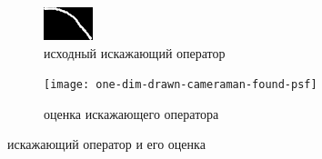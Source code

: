 \begin{figure}[h!]
	\centering
	\begin{subfigure}[b]{0.4\textwidth}
		\centering
		\includegraphics[width=\linewidth]{../input/drawn-psf3}
		\caption{исходный искажающий оператор}
		\label{fig:drawnPsf3}
	\end{subfigure}
	\begin{subfigure}[b]{0.4\textwidth}
		\centering
		\texttt{[image: one-dim-drawn-cameraman-found-psf]}
		\caption{оценка искажающего оператора}
	\end{subfigure}
	\caption{искажающий оператор и его оценка}
\end{figure}